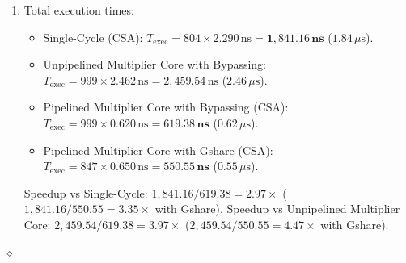 \begin{problem}
\begin{enumerate}
    Consecutive instructions enter the pipeline at \textit{1 instruction per cycle}.
    \item Total execution times:
    \begin{itemize}
        \item Single-Cycle (CSA): $T_{\text{exec}} = 804 \times 2.290\,\text{ns} = \mathbf{1,841.16\,\text{ns}}$ ($1.84\,\mu\text{s}$).
        \item Unpipelined Multiplier Core with Bypassing: $T_{\text{exec}} = 999 \times 2.462\,\text{ns} = 2,459.54\,\text{ns}$ ($2.46\,\mu\text{s}$).
        \item Pipelined Multiplier Core with Bypassing (CSA): $T_{\text{exec}} = 999 \times 0.620\,\text{ns} = \mathbf{619.38\,\text{ns}}$ ($0.62\,\mu\text{s}$).
        \item Pipelined Multiplier Core with Gshare (CSA): $T_{\text{exec}} = 847 \times 0.650\,\text{ns} = \mathbf{550.55\,\text{ns}}$ ($0.55\,\mu\text{s}$).
    \end{itemize}
    Speedup vs Single-Cycle: $1,841.16 / 619.38 = \mathbf{2.97\times}$ ($1,841.16 / 550.55 = \mathbf{3.35\times}$ with Gshare).
    Speedup vs Unpipelined Multiplier Core: $2,459.54 / 619.38 = \mathbf{3.97\times}$ ($2,459.54 / 550.55 = \mathbf{4.47\times}$ with Gshare).
\end{enumerate}
$\diamond$
\end{problem}

